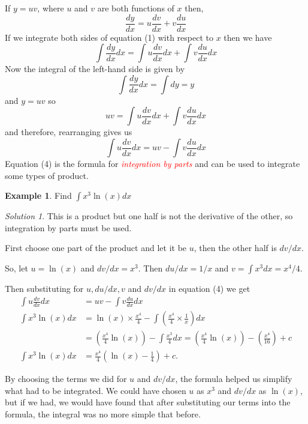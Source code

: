\documentclass[
  11pt,
  oneside]{book}
\newcommand{\slide}{}
\theoremstyle{definition}
\theoremstyle{definition}
\newtheorem{example}{Example}[chapter]
\theoremstyle{definition}
\theoremstyle{definition}
\theoremstyle{remark}
\newtheorem*{solution}{Solution}
\begin{document}
If \(y = uv\), where \(u\) and \(v\) are both functions of \(x\) then,
\[
\frac{dy}{dx} = u\frac{dv}{dx} + v\frac{du}{dx}\tag{1}
\]
If we integrate both sides of equation (1) with respect to \(x\) then we have
\[
\int\frac{dy}{dx}dx = \int u\frac{dv}{dx}dx + \int v\frac{du}{dx}dx\tag{2}
\]
Now the integral of the left-hand side is given by
\[
\int\frac{dy}{dx}dx = \int dy = y
\]
and \(y = uv\) so
\[
uv =\int u\frac{dv}{dx}dx +\int v\frac{du}{dx}dx\tag{3}
\]
and therefore, rearranging gives us
\[
\int u\frac{dv}{dx}dx = uv -\int v\frac{du}{dx}dx\tag{4}
\]
Equation (4) is the formula for \textcolor{red}{\em integration by parts} and can be used to integrate some types of
product.

\slide

\begin{example}
Find \(\displaystyle\int x^3\ln(x)dx\)
\end{example}

\begin{solution}
This is a product but one half is not the derivative of the other, so integration by parts must be used.

First choose one part of the product and let it be \(u\), then the other half is \(dv/dx\).

So, let \(u = \ln(x)\) and \(dv/dx = x^3\). Then \(du/dx = 1/x\) and \(v=\displaystyle\int x^3dx = x^4/4\).

Then substituting for \(u, du/dx, v\) and \(dv/dx\) in equation (4) we get
\begin{align*}
\int u\frac{dv}{dx}dx& = uv-\int v\frac{du}{dx}dx\\
\int x^3\ln(x)dx& = \ln(x)\times \frac{x^4}{4} - \int\left(\frac{x^4}{4}\times\frac{1}{x}\right)dx\\
&=\left(\frac{x^4}{4}\ln(x)\right)-\int\frac{x^3}{4}dx = \left(\frac{x^4}{4}\ln(x)\right) - \left(\frac{x^4}{16}\right)+c\\
\int x^3\ln(x)dx& = \frac{x^4}{4}\left(\ln(x)-\frac14\right)+c.
\end{align*}
\end{solution}

\slide

By choosing the terms we did for \(u\) and \(dv/dx\), the formula helped us simplify what had to be integrated. We could have chosen \(u\) as \(x^3\) and \(dv/dx\) as \(\ln(x)\), but if we had, we would have found that after substituting our terms into the formula, the integral was no more simple that before.
\end{document}
